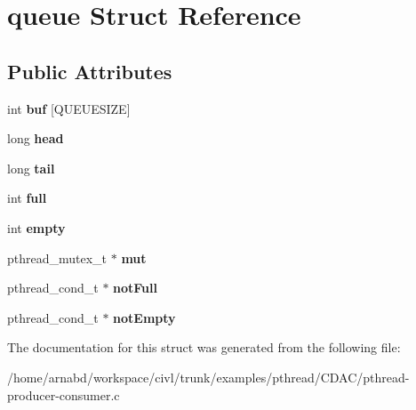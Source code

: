 \hypertarget{structqueue}{}\section{queue Struct Reference}
\label{structqueue}
\subsection*{Public Attributes}
\begin{DoxyCompactItemize}
\item 
\hypertarget{structqueue_a84bd5755549594a99317ba6a77974b40}{}int {\bfseries buf} \mbox{[}Q\+U\+E\+U\+E\+S\+I\+Z\+E\mbox{]}\label{structqueue_a84bd5755549594a99317ba6a77974b40}

\item 
\hypertarget{structqueue_ab69d45bd32ba29f89ac6da727415422c}{}long {\bfseries head}\label{structqueue_ab69d45bd32ba29f89ac6da727415422c}

\item 
\hypertarget{structqueue_a7c2664ed2c7b0a2c7886eae2025fb2a8}{}long {\bfseries tail}\label{structqueue_a7c2664ed2c7b0a2c7886eae2025fb2a8}

\item 
\hypertarget{structqueue_aef3c7c216020585de7ee45e7e49ba521}{}int {\bfseries full}\label{structqueue_aef3c7c216020585de7ee45e7e49ba521}

\item 
\hypertarget{structqueue_a6d83cbe036766ce09626be837f703c87}{}int {\bfseries empty}\label{structqueue_a6d83cbe036766ce09626be837f703c87}

\item 
\hypertarget{structqueue_a3d75f7061de647c7757b268fc8bff89f}{}pthread\+\_\+mutex\+\_\+t $\ast$ {\bfseries mut}\label{structqueue_a3d75f7061de647c7757b268fc8bff89f}

\item 
\hypertarget{structqueue_a149791f7481675506c2853849f2f4eaf}{}pthread\+\_\+cond\+\_\+t $\ast$ {\bfseries not\+Full}\label{structqueue_a149791f7481675506c2853849f2f4eaf}

\item 
\hypertarget{structqueue_ad59ffd47fbb298573c85a7462adb48d8}{}pthread\+\_\+cond\+\_\+t $\ast$ {\bfseries not\+Empty}\label{structqueue_ad59ffd47fbb298573c85a7462adb48d8}

\end{DoxyCompactItemize}


The documentation for this struct was generated from the following file\+:\begin{DoxyCompactItemize}
\item 
/home/arnabd/workspace/civl/trunk/examples/pthread/\+C\+D\+A\+C/pthread-\/producer-\/consumer.\+c\end{DoxyCompactItemize}
